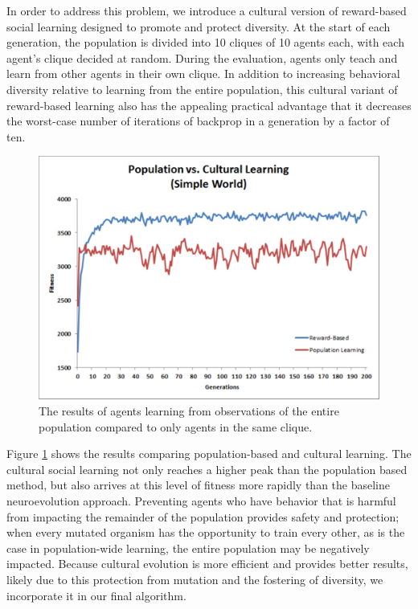 \documentclass{acm_proc_article-sp}
\begin{document}
In order to address this problem, we introduce a cultural version of reward-based social learning designed to promote and protect diversity. At the start of each generation, the population is divided into 10 cliques of 10 agents each, with each agent's clique decided at random. During the evaluation, agents only teach and learn from other agents in their own clique. In addition to increasing behavioral diversity relative to learning from the entire population, this cultural variant of reward-based learning also has the appealing practical advantage that it decreases the worst-case number of iterations of backprop in a generation by a factor of ten.

\begin{figure}
  \centering
    \includegraphics[scale=.35]{population_vs_cultural_learning.pdf}
  \caption{The results of agents learning from observations of the entire population compared to only agents in the same clique.}
  \label{fig:population-social}
\end{figure}

Figure \ref{fig:population-social} shows the results comparing population-based and cultural learning. The cultural social learning not only reaches a higher peak than the population based method, but also arrives at this level of fitness more rapidly than the baseline neuroevolution approach. Preventing agents who have behavior that is harmful from impacting the remainder of the population provides safety and protection; when every mutated organism has the opportunity to train every other, as is the case in population-wide learning, the entire population may be negatively impacted. Because cultural evolution is more efficient and provides better results, likely due to this protection from mutation and the fostering of diversity, we incorporate it in our final algorithm.
\end{document}
